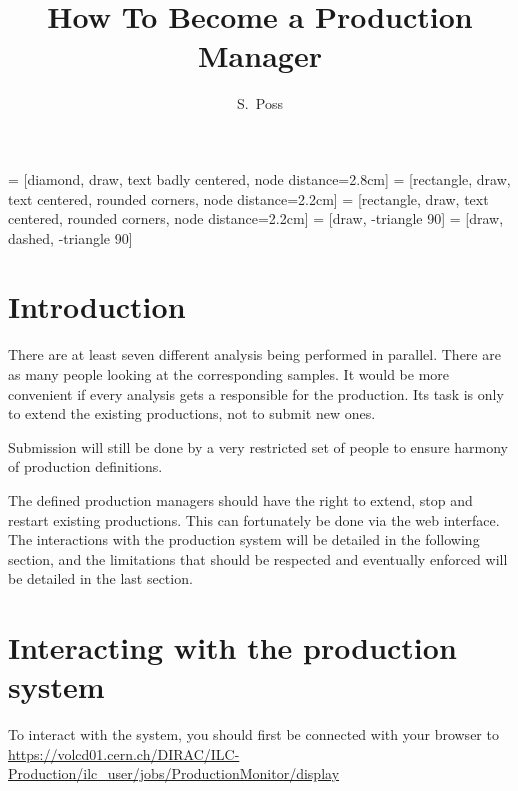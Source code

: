 \documentclass[a4paper,12pt]{article}
\title{How To Become a Production Manager}
\author{S.~Poss}
\begin{document}
 = [diamond, draw, text badly centered, node distance=2.8cm]
 = [rectangle, draw, text centered, rounded corners, node distance=2.2cm]
 = [rectangle, draw, text centered, rounded corners, node distance=2.2cm]
 = [draw, -triangle 90]
 = [draw, dashed, -triangle 90]

\maketitle
{}

\tableofcontents

\section{Introduction}
There are at least seven different analysis being performed in parallel. There
are as many people looking at the corresponding samples. It would be more
convenient if every analysis gets a responsible for the production. Its task is
only to extend the existing productions, not to submit new ones. 

Submission will
still be done by a very restricted set of people to ensure harmony of
production definitions. 

The defined production managers should have the right to extend, stop and
restart existing productions. This can fortunately be done  via the web
interface. The interactions with the production system will be detailed in the
following section, and the limitations that should be respected and eventually
enforced will be detailed in the last section.

\section{Interacting with the production system}
To interact with the system, you should first be connected with your browser
to\\
\url{https://volcd01.cern.ch/DIRAC/ILC-Production/ilc\_user/jobs/ProductionMonitor/display}
\end{document}
